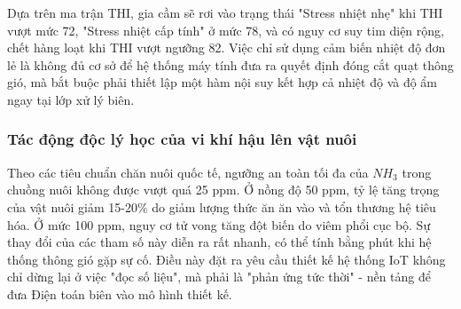 Dựa trên ma trận THI, gia cầm sẽ rơi vào trạng thái "Stress nhiệt nhẹ" khi THI vượt mức 72, "Stress nhiệt cấp tính" ở mức 78, và có nguy cơ suy tim diện rộng, chết hàng loạt khi THI vượt ngưỡng 82. Việc chỉ sử dụng cảm biến nhiệt độ đơn lẻ là không đủ cơ sở để hệ thống máy tính đưa ra quyết định đóng cắt quạt thông gió, mà bắt buộc phải thiết lập một hàm nội suy kết hợp cả nhiệt độ và độ ẩm ngay tại lớp xử lý biên.



\subsubsection{Tác động độc lý học của vi khí hậu lên vật nuôi}
Theo các tiêu chuẩn chăn nuôi quốc tế, ngưỡng an toàn tối đa của $NH_3$ trong chuồng nuôi không được vượt quá 25 ppm. Ở nồng độ 50 ppm, tỷ lệ tăng trọng của vật nuôi giảm 15-20\% do giảm lượng thức ăn ăn vào và tổn thương hệ tiêu hóa. Ở mức 100 ppm, nguy cơ tử vong tăng đột biến do viêm phổi cục bộ. Sự thay đổi của các tham số này diễn ra rất nhanh, có thể tính bằng phút khi hệ thống thông gió gặp sự cố. Điều này đặt ra yêu cầu thiết kế hệ thống IoT không chỉ dừng lại ở việc "đọc số liệu", mà phải là "phản ứng tức thời" - nền tảng để đưa Điện toán biên vào mô hình thiết kế.
